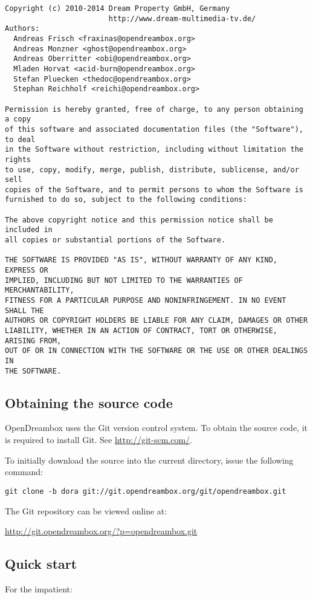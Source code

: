 \documentclass[a4paper]{article}
\newcommand{\shell}[1]{\texttt{\small #1}}
\begin{document}
    \begin{verbatim}
Copyright (c) 2010-2014 Dream Property GmbH, Germany
                        http://www.dream-multimedia-tv.de/
Authors:
  Andreas Frisch <fraxinas@opendreambox.org>
  Andreas Monzner <ghost@opendreambox.org>
  Andreas Oberritter <obi@opendreambox.org>
  Mladen Horvat <acid-burn@opendreambox.org>
  Stefan Pluecken <thedoc@opendreambox.org>
  Stephan Reichholf <reichi@opendreambox.org>

Permission is hereby granted, free of charge, to any person obtaining a copy
of this software and associated documentation files (the "Software"), to deal
in the Software without restriction, including without limitation the rights
to use, copy, modify, merge, publish, distribute, sublicense, and/or sell
copies of the Software, and to permit persons to whom the Software is
furnished to do so, subject to the following conditions:

The above copyright notice and this permission notice shall be included in
all copies or substantial portions of the Software.

THE SOFTWARE IS PROVIDED "AS IS", WITHOUT WARRANTY OF ANY KIND, EXPRESS OR
IMPLIED, INCLUDING BUT NOT LIMITED TO THE WARRANTIES OF MERCHANTABILITY,
FITNESS FOR A PARTICULAR PURPOSE AND NONINFRINGEMENT. IN NO EVENT SHALL THE
AUTHORS OR COPYRIGHT HOLDERS BE LIABLE FOR ANY CLAIM, DAMAGES OR OTHER
LIABILITY, WHETHER IN AN ACTION OF CONTRACT, TORT OR OTHERWISE, ARISING FROM,
OUT OF OR IN CONNECTION WITH THE SOFTWARE OR THE USE OR OTHER DEALINGS IN
THE SOFTWARE.
    \end{verbatim}

  \subsection{Obtaining the source code}
    OpenDreambox uses the Git version control system. To obtain the source
    code, it is required to install Git. See \url{http://git-scm.com/}.

    To initially download the source into the current directory, issue the
    following command:

    \shell{git clone -b dora git://git.opendreambox.org/git/opendreambox.git}

    The Git repository can be viewed online at:

    \url{http://git.opendreambox.org/?p=opendreambox.git}

  \subsection{Quick start}
    For the impatient:
\end{document}
